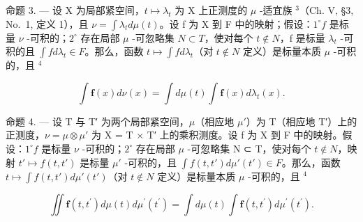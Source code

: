 命题 3. --- 设 X 为局部紧空间，\(t \mapsto \lambda_{t}\) 为 X 上正测度的 \(\mu\) -适宜族 \(^{3}\)（Ch. V, §3, No.~1, 定义 1），且 \(\nu = \int \lambda_{t} d\mu(t)\)。设 f 为 X 到 F 中的映射；假设：\(1^{\circ} f\) 是标量 \(\nu\) -可积的；\(2^{\circ}\) 存在局部 \(\mu\) -可忽略集 \(N \subset T\)，使对每个 \(t \notin N\)，f 是标量 \(\lambda_{t}\) -可积的且 \(\int f d\lambda_{t} \in F\)。那么，函数 \(t \mapsto \int f d\lambda_{t}\)（对 \(t \notin N\) 定义）是标量本质 \(\mu\) -可积的，且 \(^{4}\)

\[
\int \mathbf {f} (x) d \nu (x) = \int d \mu (t) \int \mathbf {f} (x) d \lambda_ {t} (x).
\]

命题 4. --- 设 T 与 T′ 为两个局部紧空间，\(\mu\)（相应地 \(\mu'\)）为 T（相应地 T′）上的正测度，\(\nu = \mu \otimes \mu'\) 为 X = T × T′ 上的乘积测度。设 f 为 X 到 F 中的映射。假设：\(1^{\circ} f\) 是标量 \(\nu\) -可积的；\(2^{\circ}\) 存在局部 \(\mu\) -可忽略集 N ⊂ T，使对每个 \(t \notin N\)，映射 \(t' \mapsto f(t, t')\) 是标量 \(\mu'\) -可积的，且 \(\int f(t, t') d\mu'(t') \in F\)。那么，函数 \(t \mapsto \int f(t, t') d\mu'(t')\)（对 \(t \notin N\) 定义）是标量本质 \(\mu\) -可积的，且 \(^{4}\)

\[
\iint \mathbf {f} (t, t ^ {\prime}) d \mu (t) d \mu^ {\prime} (t ^ {\prime}) = \int d \mu (t) \int \mathbf {f} (t, t ^ {\prime}) d \mu^ {\prime} (t ^ {\prime}).
\]

